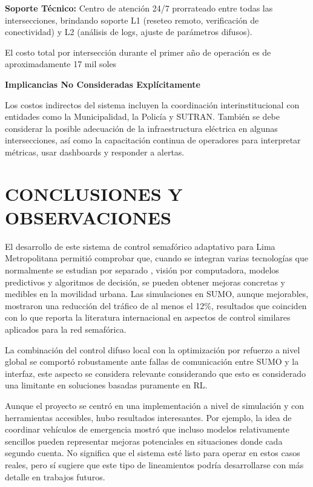 \documentclass[12pt,a4paper,oneside]{report}
\begin{document}
\textbf{Soporte Técnico:} Centro de atención 24/7 prorrateado entre todas las intersecciones, brindando soporte L1 (reseteo remoto, verificación de conectividad) y L2 (análisis de logs, ajuste de parámetros difusos).

El costo total por intersección durante el primer año de operación es de aproximadamente 17 mil soles

\textbf{Implicancias No Consideradas Explícitamente}

Los costos indirectos del sistema incluyen la coordinación interinstitucional con entidades como la Municipalidad, la Policía y SUTRAN. También se debe considerar la posible adecuación de la infraestructura eléctrica en algunas intersecciones, así como la capacitación continua de operadores para interpretar métricas, usar dashboards y responder a alertas.

\chapter*{CONCLUSIONES Y OBSERVACIONES}\label{conclusiones-y-observaciones}

El desarrollo de este sistema de control semafórico adaptativo para Lima Metropolitana permitió comprobar que, cuando se integran varias tecnologías que normalmente se estudian por separado , visión por computadora, modelos predictivos y algoritmos de decisión, se pueden obtener mejoras concretas y medibles en la movilidad urbana. Las simulaciones en SUMO, aunque mejorables, mostraron una reducción del tráfico de al menos el 12\%, resultados que coinciden con lo que reporta la literatura internacional en aspectos de control similares aplicados para la red semafórica.

La combinación del control difuso local con la optimización por refuerzo a nivel global se comportó robustamente ante fallas de comunicación entre SUMO y la interfaz, este aspecto se considera relevante considerando que esto es considerado una limitante en soluciones basadas puramente en RL.

Aunque el proyecto se centró en una implementación a nivel de simulación y con herramientas accesibles, hubo resultados interesantes. Por ejemplo, la idea de coordinar vehículos de emergencia mostró que incluso modelos relativamente sencillos pueden representar mejoras potenciales en situaciones donde cada segundo cuenta. No significa que el sistema esté listo para operar en estos casos reales, pero sí sugiere que este tipo de lineamientos podría desarrollarse con más detalle en trabajos futuros.
\end{document}
